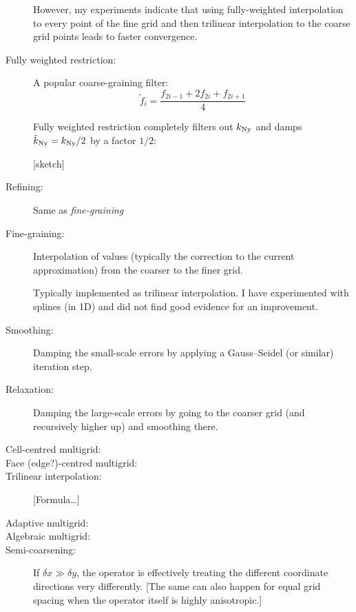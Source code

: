 \documentclass[\mydriver,12pt,twoside,notitlepage,letterpaper]{article}
\begin{document}
\begin{description}
  However, my experiments indicate that using fully-weighted interpolation
  to every point of the fine grid and then trilinear interpolation to the
  coarse grid points leads to faster convergence.

\item[Fully weighted restriction:]
  A popular coarse-graining filter:
  \begin{equation}
    \tilde{f}_{i}
    = \dfrac{f_{2i-1} + 2 f_{2i} + f_{2i+1}}
            {4}
  \end{equation}

  Fully weighted restriction completely filters out $k_{\rm Ny}$ and damps
  $\tilde{k}_{\rm Ny}=k_{\rm Ny}/2$ by a factor $1/2$:

  [sketch]

\item[Refining:] Same as \emph{fine-graining}
\item[Fine-graining:]
  Interpolation of values (typically the correction to the current
  approximation) from the coarser to the finer grid.

  Typically implemented as trilinear interpolation.
  I have experimented with splines (in 1D) and did not find good evidence
  for an improvement.

\item[Smoothing:]
  Damping the small-scale errors by applying a Gauss--Seidel (or similar)
  iteration step.

\item[Relaxation:]
  Damping the large-scale errors by going to the coarser grid (and
  recursively higher up) and smoothing there.

\item[Cell-centred multigrid:]

\item[Face (edge?)-centred multigrid:]

\item[Trilinear interpolation:]
  [Formula\ldots]

\item[Adaptive multigrid:]
\item[Algebraic multigrid:]

\item[Semi-coarsening:]
  If $\delta x \gg \delta y$, the operator is effectively treating the
  different coordinate directions very differently.
  [The same can also happen for equal grid spacing when the operator
  itself is highly anisotropic.]


\end{description}
\end{document}
